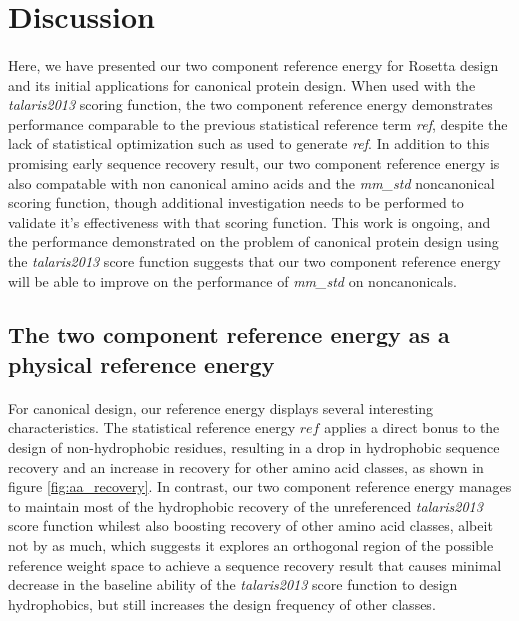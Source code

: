 \section{Discussion}

\paragraph{}
Here, we have presented our two component reference energy for Rosetta design and its initial applications for canonical protein design.
When used with the \textit{talaris2013} scoring function, the two component reference energy demonstrates performance comparable to the previous statistical reference term \textit{ref}, despite the lack of statistical optimization such as used to generate \textit{ref}\cite{leaver-fay_chapter_2013}.
In addition to this promising early sequence recovery result, our two component reference energy is also compatable with non canonical amino acids and the \textit{mm\_std} noncanonical scoring function, though additional investigation needs to be performed to validate it's effectiveness with that scoring function.
This work is ongoing, and the performance demonstrated on the problem of canonical protein design using the \textit{talaris2013} score function suggests that our two component reference energy will be able to improve on the performance of \textit{mm\_std} on noncanonicals.

\subsection{The two component reference energy as a physical reference energy}
\paragraph{}
For canonical design, our reference energy displays several interesting characteristics.
The statistical reference energy $ref$ applies a direct bonus to the design of non-hydrophobic residues, resulting in a drop in hydrophobic sequence recovery and an increase in recovery for other amino acid classes, as shown in figure \ref{fig:aa_recovery}.
In contrast, our two component reference energy manages to maintain most of the hydrophobic recovery of the unreferenced \textit{talaris2013} score function whilest also boosting recovery of other amino acid classes, albeit not by as much, which suggests it explores an orthogonal region of the possible reference weight space to achieve a sequence recovery result that causes minimal decrease in the baseline ability of the \textit{talaris2013} score function to design hydrophobics, but still increases the design frequency of other classes.

